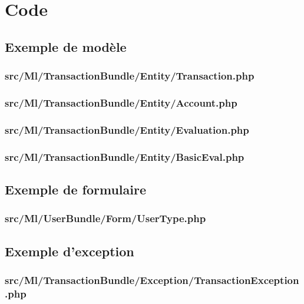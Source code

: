 \chapter{Code}

\section{Exemple de modèle}

\subsection{src/Ml/TransactionBundle/Entity/Transaction.php}

\subsection{src/Ml/TransactionBundle/Entity/Account.php}

\subsection{src/Ml/TransactionBundle/Entity/Evaluation.php}

\subsection{src/Ml/TransactionBundle/Entity/BasicEval.php}


\section{Exemple de formulaire}

\subsection{src/Ml/UserBundle/Form/UserType.php}


\section{Exemple d'exception}

\subsection{src/Ml/TransactionBundle/Exception/TransactionException.php}

